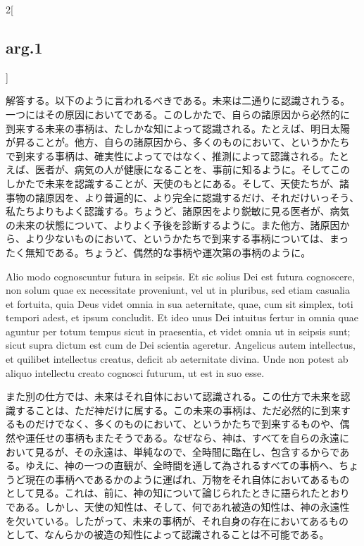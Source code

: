 \documentclass[paper=a4paper,fontsize=10pt,jafontsize=9pt,titlepage]{jlreq}
\begin{document}
\begin{paracol}{2}[\subsection{arg.1}]
\switchcolumn

解答する。以下のように言われるべきである。未来は二通りに認識されうる。
一つにはその原因においてである。このしかたで、自らの諸原因から必然的に
到来する未来の事柄は、たしかな知によって認識される。たとえば、明日太陽
が昇ることが。他方、自らの諸原因から、多くのものにおいて、というかたち
で到来する事柄は、確実性によってではなく、推測によって認識される。たと
えば、医者が、病気の人が健康になることを、事前に知るように。そしてこの
しかたで未来を認識することが、天使のもとにある。そして、天使たちが、諸
事物の諸原因を、より普遍的に、より完全に認識するだけ、それだけいっそう、
私たちよりもよく認識する。ちょうど、諸原因をより鋭敏に見る医者が、病気
の未来の状態について、よりよく予後を診断するように。また他方、諸原因か
ら、より少ないものにおいて、というかたちで到来する事柄については、まっ
たく無知である。ちょうど、偶然的な事柄や運次第の事柄のように。

\switchcolumn*

Alio modo cognoscuntur futura in seipsis. Et sic solius Dei est futura
cognoscere, non solum quae ex necessitate proveniunt, vel ut in
pluribus, sed etiam casualia et fortuita, quia Deus videt omnia in sua
aeternitate, quae, cum sit simplex, toti tempori adest, et ipsum
concludit. Et ideo unus Dei intuitus fertur in omnia quae aguntur per
totum tempus sicut in praesentia, et videt omnia ut in seipsis sunt;
sicut supra dictum est cum de Dei scientia ageretur. Angelicus autem
intellectus, et quilibet intellectus creatus, deficit ab aeternitate
divina. Unde non potest ab aliquo intellectu creato cognosci futurum,
ut est in suo esse.

\switchcolumn

また別の仕方では、未来はそれ自体において認識される。この仕方で未来を認
識することは、ただ神だけに属する。この未来の事柄は、ただ必然的に到来す
るものだけでなく、多くのものにおいて、というかたちで到来するものや、偶
然や運任せの事柄もまたそうである。なぜなら、神は、すべてを自らの永遠に
おいて見るが、その永遠は、単純なので、全時間に臨在し、包含するからであ
る。ゆえに、神の一つの直観が、全時間を通して為されるすべての事柄へ、ちょ
うど現在の事柄へであるかのように運ばれ、万物をそれ自体においてあるもの
として見る。これは、前に、神の知について論じられたときに語られたとおり
である。しかし、天使の知性は、そして、何であれ被造の知性は、神の永遠性
を欠いている。したがって、未来の事柄が、それ自身の存在においてあるもの
として、なんらかの被造の知性によって認識されることは不可能である。

\switchcolumn*[\subsection{ad.1}]


\end{paracol}
\end{document}
